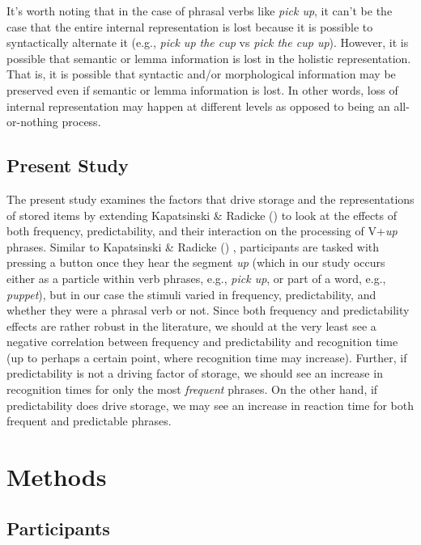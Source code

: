 \documentclass[
  12pt,
  letterpaper,
]{scrreprt}
\begin{document}
It's worth noting that in the case of phrasal verbs like \emph{pick up},
it can't be the case that the entire internal representation is lost
because it is possible to syntactically alternate it (e.g., \emph{pick
up the cup} vs \emph{pick the cup up}). However, it is possible that
semantic or lemma information is lost in the holistic representation.
That is, it is possible that syntactic and/or morphological information
may be preserved even if semantic or lemma information is lost. In other
words, loss of internal representation may happen at different levels as
opposed to being an all-or-nothing process.

\subsection{Present Study}\label{present-study}

The present study examines the factors that drive storage and the
representations of stored items by extending Kapatsinski \& Radicke
() to look
at the effects of both frequency, predictability, and their interaction
on the processing of V+\emph{up} phrases. Similar to Kapatsinski \&
Radicke ()
, participants are tasked with pressing a button once they hear the
segment \emph{up} (which in our study occurs either as a particle within
verb phrases, e.g., \emph{pick up}, or part of a word, e.g.,
\emph{puppet}), but in our case the stimuli varied in frequency,
predictability, and whether they were a phrasal verb or not. Since both
frequency and predictability effects are rather robust in the
literature, we should at the very least see a negative correlation
between frequency and predictability and recognition time (up to perhaps
a certain point, where recognition time may increase). Further, if
predictability is not a driving factor of storage, we should see an
increase in recognition times for only the most \emph{frequent} phrases.
On the other hand, if predictability does drive storage, we may see an
increase in reaction time for both frequent and predictable phrases.

\section{Methods}\label{methods-4}

\subsection{Participants}\label{participants-4}
\end{document}
